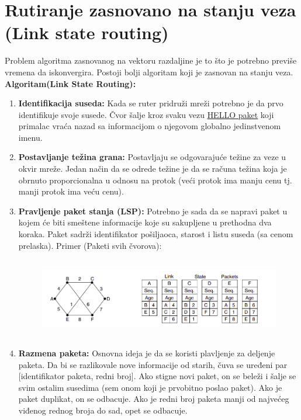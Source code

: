 \documentclass[a4paper]{article}
\begin{document}
\section{Rutiranje zasnovano na stanju veza (Link state routing)}
    Problem algoritma zasnovanog na vektoru razdaljine je to što je potrebno previše vremena
    da iskonvergira. Postoji bolji algoritam koji je zasnovan na stanju veza.\\
    \noindent \textbf{Algoritam(Link State Routing):}
    \begin{enumerate}
        \item \textbf{Identifikacija suseda:} Kada se ruter pridruži mreži potrebno je da prvo
              identifikuje svoje susede. Čvor šalje kroz svaku vezu \underline{HELLO paket} koji primalac
              vraća nazad sa informacijom o njegovom globalno jedinstvenom imenu. 
        \item \textbf{Postavljanje težina grana:} Postavljaju se odgovarajuće težine za
              veze u okvir mreže. Jedan način da se odrede težine je da se računa težina koja je obrnuto
              proporcionalna u odnosu na protok (veći protok ima manju cenu tj. manji protok
              ima veću cenu).
        \item \textbf{Pravljenje paket stanja (LSP):} Potrebno je sada da se napravi paket 
              u kojem će biti smeštene informacije koje su sakupljene u prethodna dva koraka.
              Paket sadrži identifikator pošiljaoca, starost i listu suseda (sa cenom prelaska).
              Primer (Paketi svih čvorova):
              \begin{figure}[H]
                \begin{center}
                    \includegraphics[width=120mm,height=35mm]{Slike/rzsv1.png}
                \end{center}
              \end{figure}
        \item \textbf{Razmena paketa:} Osnovna ideja je da se koristi plavljenje za deljenje
              paketa. Da bi se razlikovale nove informacije od starih, čuva se uređeni par
              [identifikator paketa, redni broj]. Ako stigne novi paket, on se beleži i šalje
              se svim ostalim susedima (sem onom koji je prvobitno poslao paket). Ako je paket duplikat,
              on se odbacuje. Ako je redni broj paketa manji od najvećeg viđenog rednog broja do sad,
              opet se odbacuje. \\


\end{enumerate}
\end{document}
